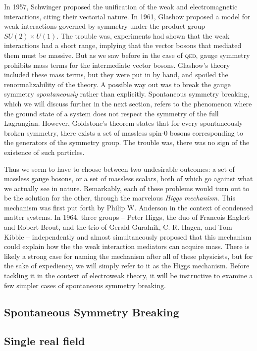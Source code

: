 In 1957, Schwinger proposed the unification of the weak and electromagnetic interactions, citing their vectorial nature. In 1961, Glashow proposed a model for weak interactions governed by symmetry under the product group $SU(2)\times U(1)$. The trouble was, experiments had shown that the weak interactions had a short range, implying that the vector bosons that mediated them must be massive. But as we saw before in the case of \textsc{qed}, gauge symmetry prohibits mass terms for the intermediate vector bosons. Glashow's theory included these mass terms, but they were put in by hand, and spoiled the renormalizability of the theory. A possible way out was to break the gauge symmetry \emph{spontaneously} rather than explicitly. Spontaneous symmetry breaking, which we will discuss further in the next section, refers to the phenomenon where the ground state of a system does not respect the symmetry of the full Lagrangian. However, Goldstone's theorem states that for every spontaneously broken symmetry, there exists a set of massless spin-0 bosons corresponding to the generators of the symmetry group. The trouble was, there was no sign of the existence of such particles. 

Thus we seem to have to choose between two undesirable outcomes: a set of massless gauge bosons, or a set of massless scalars, both of which go against what we actually see in nature. Remarkably, each of these problems would turn out to be the solution for the other, through the marvelous \emph{Higgs mechanism}. This mechanism was first put forth by Philip W. Anderson in the context of condensed matter systems. In 1964, three groups -- Peter Higgs, the duo of Francois Englert and Robert Brout, and the trio of Gerald Guralnik, C. R. Hagen, and Tom Kibble -- independently and almost simultaneously proposed that this mechanism could explain how the the weak interaction mediators can acquire mass. There is likely a strong case for naming the mechanism after all of these physicists, but for the sake of expediency, we will simply refer to it as the Higgs mechanism. Before tackling it in the context of electroweak theory, it will be instructive to examine a few simpler cases of spontaneous symmetry breaking. 

\subsection{Spontaneous Symmetry Breaking}
\subsection{Single real field}

